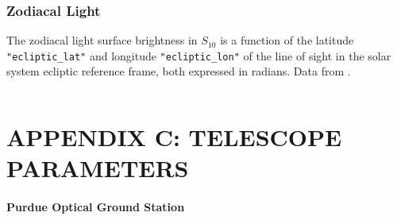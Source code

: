 \begin{listing}[H]
\inputminted[breaklines=true, breakanywhere=true, breaksymbol=\hspace{0pt}, fontsize=\footnotesize]{json}{/Users/liamrobinson/Documents/PyLightCurves/mirage/resources/data/moonlight.json}
\end{listing}

\clearpage
\subsection{Zodiacal Light} \label{data:roach_zod}

The zodiacal light surface brightness in $S_10$ is a function of the latitude \texttt{"ecliptic\_lat"} and longitude \texttt{"ecliptic\_lon"} of the line of sight in the solar system ecliptic reference frame, both expressed in radians. Data from \cite{roach1972}.

\begin{listing}[H]
\inputminted[breaklines=true, breakanywhere=true, breaksymbol=\hspace{0pt}, fontsize=\footnotesize]{json}{/Users/liamrobinson/Documents/PyLightCurves/mirage/resources/data/zodiacal.json}
\end{listing}

\clearpage
\chapter{APPENDIX C: TELESCOPE PARAMETERS}

\subsubsection{Purdue Optical Ground Station}

